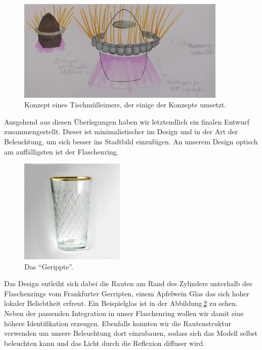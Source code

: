     \begin{figure}[H]
        \centering
        \includegraphics[width=10cm]{media/01_project/sketch_party_bin.jpg}
        \caption{Konzept eines Tischmülleimers, der einige der Konzepte umsetzt.}
        \label{fig:light_bin_1}
    \end{figure}

    Ausgehend aus diesen Überlegungen haben wir letztendlich ein finalen Entwurf zusammengestellt. Dieser ist minimalistischer im Design und in der Art der Beleuchtung, um sich besser ins Stadtbild einzufügen.
    An unserem Design optisch am auffälligsten ist der Flaschenring.

    \begin{figure}[H]
        \centering
        \includegraphics[width=5cm]{media/01_project/picture_geripptes.jpg}
        \caption{Das \enquote{Gerippte}.}
        \label{fig:picture_gerippte}
    \end{figure}

    Das Design entleiht sich dabei die Rauten am Rand des Zylinders unterhalb des Flaschenrings vom Frankfurter Gerripten, einem Apfelwein Glas das sich hoher lokaler Beliebtheit erfreut. Ein Beispielglas ist in der Abbildung\,\ref{fig:picture_gerippte} zu sehen. Neben der passenden Integration in unser Flaschenring wollen wir damit eine höhere Identifikation erzeugen.
    Ebenfalls konnten wir die Rautenstruktur verwenden um unsere Beleuchtung dort einzubauen, sodass sich das Modell selbst beleuchten kann und das Licht durch die Reflexion diffuser wird.
    
